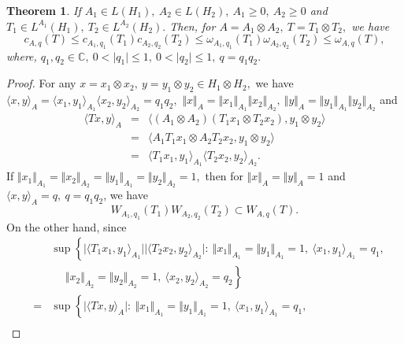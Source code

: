 \documentclass[preprint,12pt,3p]{elsarticle}
\newtheorem{theorem}{Theorem}
\begin{document}
\begin{theorem}
\label{thm3}
If $ A_{1}\in L(H_{1}), \ A_{2}\in L(H_{2}), \ A_{1}\geq 0, \ A_{2}\geq 0 $ and $ T_{1}\in L^{A_{1}}(H_{1}), \ T_{2}\in L^{A_{2}}(H_{2}).  $ Then, for $ A=A_{1}\otimes A_{2}, \  T=T_{1}\otimes T_{2}, $ we have
$$
c_{A,q}(T)\leq c_{A_{1},q_{1}}(T_{1})c_{A_{2},q_{2}}(T_{2}) \leq \omega_{A_{1},q_{1}}(T_{1})\omega_{A_{2},q_{2}}(T_{2})\leq \omega_{A,q}(T),
$$
where, $ q_{1},q_{2}\in \mathbb{C}, \ 0<\vert q_{1} \vert \leq 1, \ 0<\vert q_{2} \vert \leq 1, \ q=q_{1}q_{2}.  $
\end{theorem}
\begin{proof}
    For any $ x=x_{1}\otimes x_{2}, \ y=y_{1}\otimes y_{2}\in H_{1}\otimes H_{2}, $ we have $ \langle x,y \rangle_{A}= \langle x_{1},y_{1} \rangle_{A_{1}} \langle x_{2},y_{2} \rangle_{A_{2}}=q_{1}q_{2},$ $ \Vert x \Vert_{A}= \Vert x_{1} \Vert_{A_{1}}\Vert x_{2} \Vert_{A_{2}}, \ \Vert y \Vert_{A}= \Vert y_{1} \Vert_{A_{1}}\Vert y_{2} \Vert_{A_{2}} $ and
\begin{eqnarray}
\langle Tx,y \rangle_{A} & = & \langle (A_{1}\otimes A_{2})(T_{1}x_{1}\otimes T_{2}x_{2}), y_{1}\otimes y_{2}\rangle \nonumber \\
& = & \langle A_{1}T_{1}x_{1}\otimes A_{2}T_{2}x_{2}, y_{1}\otimes y_{2}\rangle \nonumber \\
& = & \langle T_{1}x_{1}, y_{1}\rangle_{A_{1}} \langle T_{2}x_{2}, y_{2}\rangle_{A_{2}} .\nonumber 
\end{eqnarray}
If $ \Vert x_{1} \Vert_{A_{1}} = \Vert x_{2} \Vert_{A_{2}} = \Vert y_{1} \Vert_{A_{1}} = \Vert y_{2} \Vert_{A_{2}}=1, $
then for $ \Vert x \Vert_{A}=\Vert y \Vert_{A}=1 $ and $ \langle x,y \rangle_{A}=q, \ q=q_{1}q_{2} $, we have 
$$
W_{A_{1},q_{1}}(T_{1})W_{A_{2},q_{2}}(T_{2})\subset W_{A,q}(T).
$$
On the other hand, since
\begin{eqnarray}
& & \sup \left\lbrace  \vert \langle T_{1}x_{1}, y_{1}\rangle_{A_{1}} \vert \vert \langle T_{2}x_{2}, y_{2}\rangle_{A_{2}} \vert: \ \Vert x_{1} \Vert_{A_{1}}=\Vert y_{1} \Vert_{A_{1}}=1, \ \langle x_{1},y_{1}\rangle_{A_{1}} =q_{1}, \right.  \nonumber \\
& & \ \ \ \ \ \ \left.  \Vert x_{2} \Vert_{A_{2}}=\Vert y_{2} \Vert_{A_{2}}=1, \ \langle x_{2},y_{2}\rangle_{A_{2}} =q_{2}  \right\rbrace   \nonumber \\
& = & \sup \left\lbrace  \vert \langle Tx, y\rangle_{A} \vert : \ \Vert x_{1} \Vert_{A_{1}}=\Vert y_{1} \Vert_{A_{1}}=1, \ \langle x_{1},y_{1}\rangle_{A_{1}} =q_{1}, \right.  \nonumber \\

\end{eqnarray}
\end{proof}
\end{document}
